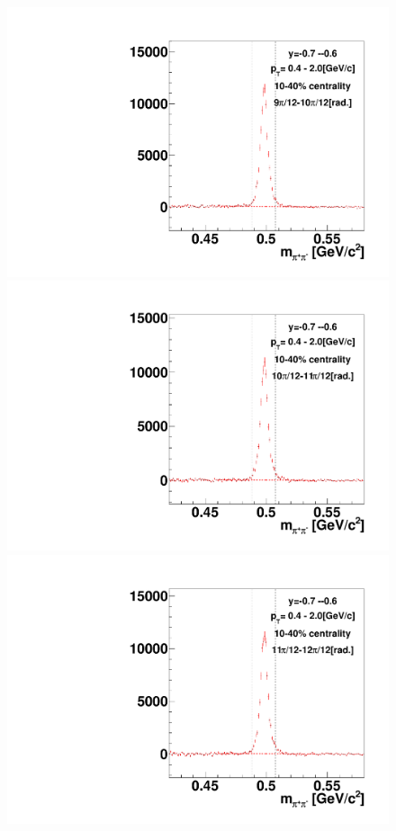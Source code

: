 \begin{figure}[h]
\includegraphics[width=0.14\linewidth]{chapterX/fig/ks_v1_sig/kf_ptslice0_cent1_ks_flow_phi10_rap11.pdf}
\includegraphics[width=0.14\linewidth]{chapterX/fig/ks_v1_sig/kf_ptslice0_cent1_ks_flow_phi11_rap11.pdf}
\includegraphics[width=0.14\linewidth]{chapterX/fig/ks_v1_sig/kf_ptslice0_cent1_ks_flow_phi12_rap11.pdf}


\end{figure}
